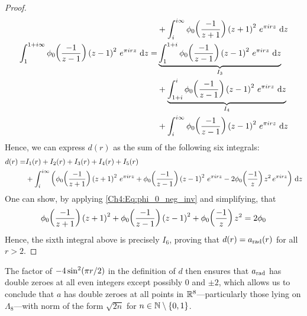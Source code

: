 \begin{proof}
\begin{align*}
        &+ \int_{i}^{i \infty} \phi_0\of{\frac{-1}{z + 1}} \parenth{z + 1}^2 \, e^{\pi i r z} \, \diff{z} \\
        \int_{1}^{1 + i \infty} \phi_0\of{\frac{-1}{z - 1}} \parenth{z - 1}^2 \, e^{\pi i r z} \, \diff{z}
        =& \underbrace{\int_{1}^{1 + i} \phi_0\of{\frac{-1}{z - 1}} \parenth{z - 1}^2 \, e^{\pi i r z} \, \diff{z}}_{I_3} \\
        &+ \underbrace{\int_{1 + i}^{i} \phi_0\of{\frac{-1}{z - 1}} \parenth{z - 1}^2 \, e^{\pi i r z} \, \diff{z}}_{I_4} \\
        &+ \int_{i}^{i \infty} \phi_0\of{\frac{-1}{z - 1}} \parenth{z - 1}^2 \, e^{\pi i r z} \, \diff{z} %
    \end{align*}
    Hence, we can express $d(r)$ as the sum of the following six integrals:
    \begin{align*}
        d(r) =& I_1(r) + I_2(r) + I_3(r) + I_4(r) + I_5(r) \\
        &+ \int_{i}^{i\infty} \left( 
            \phi_0\!\left( \frac{-1}{z + 1} \right) \left( z + 1 \right)^2 \, e^{\pi i r z} +
            \phi_0\!\left( \frac{-1}{z - 1} \right) \left( z - 1 \right)^2 \, e^{\pi i r z} - 2
            \phi_0\!\left( \frac{-1}{z} \right) z^2 \, e^{\pi i r z}
         \right) \, \operatorname{d}\!{z}
    \end{align*}
    One can show, by applying \eqref{Ch4:Eq:phi_0_neg_inv} and simplifying, that
    \begin{align*}
        \phi_0\!\left( \frac{-1}{z + 1} \right) \left( z + 1 \right)^2 +
        \phi_0\!\left( \frac{-1}{z - 1} \right) \left( z - 1 \right)^2 +
        \phi_0\!\left( \frac{-1}{z} \right) z^2 = 2\phi_0
    \end{align*}
    Hence, the sixth integral above is precisely $I_6$, proving that $d(r) = a_{\operatorname{rad}}(r)$ for all $r > 2$.
\end{proof}

The factor of $-4\sin^2\!\left( \pi r / 2 \right)$ in the definition of $d$ then ensures that $a_{\operatorname{rad}}$ has double zeroes at all even integers except possibly $0$ and $\pm 2$, which allows us to conclude that $a$ has double zeroes at all points in $\mathbb{R}^8$---particularly those lying on $\Lambda_8$---with norm of the form $\sqrt{2n}$ for $n \in \mathbb{N} \setminus \left\{ 0, 1 \right\}$.

